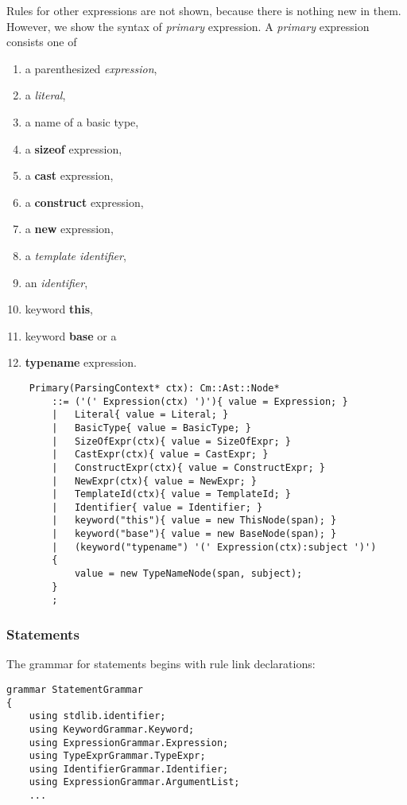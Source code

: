 \documentclass[a4paper,oneside,11pt]{book}
\theoremstyle{definition}
\begin{document}
Rules for other expressions are not shown, because there is nothing new in them.
However, we show the syntax of \emph{primary} expression.
A \emph{primary} expression consists one of
\begin{enumerate}
\item
a parenthesized \emph{expression},
\item
a \emph{literal},
\item
a name of a basic type,
\item
a \textbf{sizeof} expression,
\item
a \textbf{cast} expression,
\item
a \textbf{construct} expression,
\item
a \textbf{new} expression,
\item
a \emph{template identifier},
\item
an \emph{identifier},
\item
keyword \textbf{this},
\item
keyword \textbf{base} or a
\item
\textbf{typename} expression.
\end{enumerate}

\lstset{language=cmpg}
\begin{lstlisting}
    Primary(ParsingContext* ctx): Cm::Ast::Node*
        ::= ('(' Expression(ctx) ')'){ value = Expression; }
        |   Literal{ value = Literal; }
        |   BasicType{ value = BasicType; }
        |   SizeOfExpr(ctx){ value = SizeOfExpr; }
        |   CastExpr(ctx){ value = CastExpr; }
        |   ConstructExpr(ctx){ value = ConstructExpr; }
        |   NewExpr(ctx){ value = NewExpr; }
        |   TemplateId(ctx){ value = TemplateId; }
        |   Identifier{ value = Identifier; }
        |   keyword("this"){ value = new ThisNode(span); }
        |   keyword("base"){ value = new BaseNode(span); }
        |   (keyword("typename") '(' Expression(ctx):subject ')')
        {
            value = new TypeNameNode(span, subject);
        }
        ;
\end{lstlisting}

\clearpage
\subsubsection{Statements}

The grammar for statements begins with rule link declarations:

\lstset{language=cmpg}
\begin{lstlisting}
grammar StatementGrammar
{
    using stdlib.identifier;
    using KeywordGrammar.Keyword;
    using ExpressionGrammar.Expression;
    using TypeExprGrammar.TypeExpr;
    using IdentifierGrammar.Identifier;
    using ExpressionGrammar.ArgumentList;
    ...
\end{lstlisting}
\end{document}
